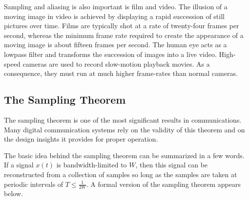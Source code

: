 Sampling and aliasing is also important is film and video.
The illusion of a moving image in video is achieved by displaying a rapid succession of still pictures over time.
Films are typically shot at a rate of twenty-four frames per second, whereas the minimum frame rate required to create the appearance of a moving image is about fifteen frames per second.
The human eye acts as a lowpass filter and transforms the succession of images into a live video.
High-speed cameras are used to record slow-motion playback movies.
As a consequence, they must run at much higher frame-rates than normal cameras.

\subsection{The Sampling Theorem}

The sampling theorem is one of the most significant results in communications.
Many digital communication systems rely on the validity of this theorem and on the design insights it provides for proper operation.

The basic idea behind the sampling theorem can be summarized in a few words.
If a signal $x(t)$ is bandwidth-limited to $W$, then this signal can be reconstructed from a collection of samples so long as the samples are taken at periodic intervals of $T \leq \frac{1}{2W}$.
A formal version of the sampling theorem appears below.

